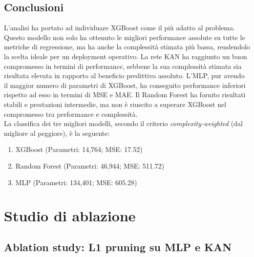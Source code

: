 \documentclass[a4paper,12pt]{report}
\begin{document}
	\subsection{Conclusioni}
	L'analisi ha portato ad individuare XGBoost come il più adatto al problema. Questo modello non solo ha ottenuto le migliori performance assolute su tutte le metriche di regressione, ma ha anche la complessità stimata più bassa, rendendolo la scelta ideale per un deployment operativo. La rete KAN ha raggiunto un buon compromesso in termini di performance, sebbene la sua complessità stimata sia risultata elevata in rapporto al beneficio predittivo assoluto. L'MLP, pur avendo il maggior numero di parametri di XGBoost, ha conseguito performance inferiori rispetto ad esso in termini di MSE e MAE. Il Random Forest ha fornito risultati stabili e prestazioni intermedie, ma non è riuscito a superare XGBoost nel compromesso tra performance e complessità. \\
	La classifica dei tre migliori modelli, secondo il criterio \emph{complexity-weighted} (dal migliore al peggiore), è la seguente:
	\begin{enumerate}
		\item XGBoost (Parametri: 14,764; MSE: 17.52)
		\item Random Forest (Parametri: 46,944; MSE: 511.72)
		\item MLP (Parametri: 134,401; MSE: 605.28)
	\end{enumerate}
	
	\section{Studio di ablazione}
	
	\subsection{Ablation study: L1 pruning su MLP e KAN}
	
\end{document}
